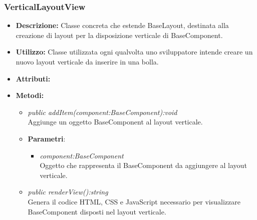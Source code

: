 \subsubsection{VerticalLayoutView}
\begin{itemize}
\item \textbf{Descrizione:} Classe concreta che estende BaseLayout, destinata alla creazione di layout per la disposizione verticale di BaseComponent.
\item \textbf{Utilizzo:} Classe utilizzata ogni qualvolta uno sviluppatore intende creare un nuovo layout verticale da inserire in una bolla.
\item \textbf{Attributi:}
\item \textbf{Metodi:}
\begin{itemize}
\item \textit{public addItem(component:BaseComponent):void}\\
Aggiunge un oggetto BaseComponent al layout verticale.
\item{\textbf{Parametri}: \begin{itemize}
\item \textit{component:BaseComponent}\\
Oggetto che rappresenta il BaseComponent da aggiungere al layout verticale.
\end{itemize}}
\item \textit{public renderView():string}\\
Genera il codice HTML, CSS e JavaScript necessario per visualizzare BaseComponent disposti nel layout verticale.
\end{itemize}
\end{itemize}


